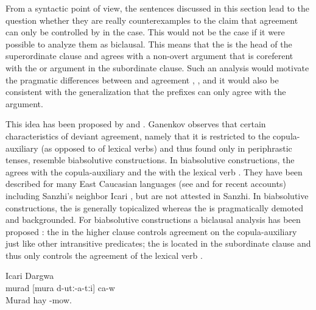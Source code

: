 From a syntactic point of view, the sentences discussed in this section lead to the question whether they are really counterexamples to the claim that  agreement can only be controlled by  in the  case. This would not be the case if it were possible to analyze them as biclausal. This means that the  is the head of the superordinate clause and agrees with a non-overt  argument that is coreferent with the  or  argument in the subordinate clause. Such an analysis would motivate the pragmatic differences between  and  agreement , , and it would also be consistent with the generalization that the prefixes can only agree with the  argument. 

This idea has been proposed by \citet{Sumbatova2010} and \citet{GanenkovForthcoming}. Ganenkov observes that certain characteristics of deviant  agreement, namely that it is restricted to the copula-auxiliary (as opposed to  of lexical verbs) and thus found only in periphrastic tenses, resemble biabsolutive constructions. In biabsolutive constructions, the  agrees with the copula-auxiliary and the  with the lexical verb . They have been described for many East Caucasian languages (see \citet{Forker2012a} and \citet{Gagliardietal.2014} for recent accounts) including Sanzhi's neighbor Icari \citet[156]{Sumbatova.Mutalov2003}, but are not attested in Sanzhi. In biabsolutive constructions, the  is generally topicalized whereas the  is pragmatically demoted and backgrounded. For biabsolutive constructions a biclausal analysis has been proposed \citep{Kazenin1998, Kazenin.Testelec1999, Kazenin2001}: the  in the higher clause controls agreement on the copula-auxiliary just like other intransitive predicates; the  is located in the subordinate clause and thus only controls the agreement of the lexical verb .

\begin{exe}
	\ex	Icari Dargwa \citep[156]{Sumbatova.Mutalov2003} \\\label{ex:As to Murad, he is mowing hay.}
	\gll	murad	[mura	d-utː-a-tːi]	ca-w\\
		Murad	hay	-mow.	\\
	\glt	{}
\end{exe}

